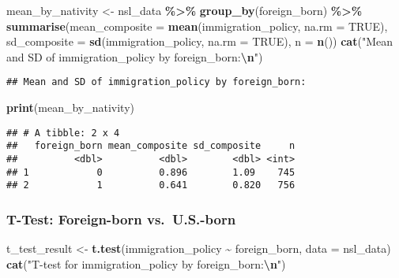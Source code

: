 \documentclass[
]{article}
\newenvironment{Shaded}{\begin{snugshade}}{\end{snugshade}}
\newcommand{\AttributeTok}[1]{\textcolor[rgb]{0.13,0.29,0.53}{#1}}
\newcommand{\ConstantTok}[1]{\textcolor[rgb]{0.56,0.35,0.01}{#1}}
\newcommand{\FunctionTok}[1]{\textcolor[rgb]{0.13,0.29,0.53}{\textbf{#1}}}
\newcommand{\NormalTok}[1]{#1}
\newcommand{\OtherTok}[1]{\textcolor[rgb]{0.56,0.35,0.01}{#1}}
\newcommand{\SpecialCharTok}[1]{\textcolor[rgb]{0.81,0.36,0.00}{\textbf{#1}}}
\newcommand{\StringTok}[1]{\textcolor[rgb]{0.31,0.60,0.02}{#1}}
\begin{document}
\begin{Shaded}
\begin{Highlighting}[]
\NormalTok{mean\_by\_nativity }\OtherTok{\textless{}{-}}\NormalTok{ nsl\_data }\SpecialCharTok{\%\textgreater{}\%}
  \FunctionTok{group\_by}\NormalTok{(foreign\_born) }\SpecialCharTok{\%\textgreater{}\%}
  \FunctionTok{summarise}\NormalTok{(}\AttributeTok{mean\_composite =} \FunctionTok{mean}\NormalTok{(immigration\_policy, }\AttributeTok{na.rm =} \ConstantTok{TRUE}\NormalTok{),}
            \AttributeTok{sd\_composite =} \FunctionTok{sd}\NormalTok{(immigration\_policy, }\AttributeTok{na.rm =} \ConstantTok{TRUE}\NormalTok{),}
            \AttributeTok{n =} \FunctionTok{n}\NormalTok{())}
\FunctionTok{cat}\NormalTok{(}\StringTok{"Mean and SD of immigration\_policy by foreign\_born:}\SpecialCharTok{\textbackslash{}n}\StringTok{"}\NormalTok{)}
\end{Highlighting}
\end{Shaded}

\begin{verbatim}
## Mean and SD of immigration_policy by foreign_born:
\end{verbatim}

\begin{Shaded}
\begin{Highlighting}[]
\FunctionTok{print}\NormalTok{(mean\_by\_nativity)}
\end{Highlighting}
\end{Shaded}

\begin{verbatim}
## # A tibble: 2 x 4
##   foreign_born mean_composite sd_composite     n
##          <dbl>          <dbl>        <dbl> <int>
## 1            0          0.896        1.09    745
## 2            1          0.641        0.820   756
\end{verbatim}

\subsubsection{T-Test: Foreign-born
vs.~U.S.-born}\label{t-test-foreign-born-vs.-u.s.-born}

\begin{Shaded}
\begin{Highlighting}[]
\NormalTok{t\_test\_result }\OtherTok{\textless{}{-}} \FunctionTok{t.test}\NormalTok{(immigration\_policy }\SpecialCharTok{\textasciitilde{}}\NormalTok{ foreign\_born, }\AttributeTok{data =}\NormalTok{ nsl\_data)}
\FunctionTok{cat}\NormalTok{(}\StringTok{"T{-}test for immigration\_policy by foreign\_born:}\SpecialCharTok{\textbackslash{}n}\StringTok{"}\NormalTok{)}
\end{Highlighting}
\end{Shaded}
\end{document}

